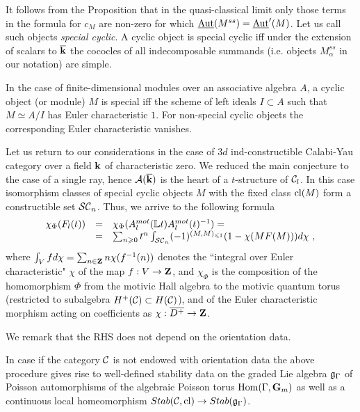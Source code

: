 \documentclass[12pt]{article}
\begin{document}
It follows from the Proposition that in the quasi-classical limit only those terms in the formula for $c_M$ are non-zero for which $\underline{\operatorname{Aut}}(M^{ss})=\underline{\operatorname{Aut}}'(M)$. Let us call such objects {\it special cyclic}.  A cyclic object is special cyclic iff under the extension of scalars
to ${\overline{\bf k}}$ the cococles of all indecomposable summands (i.e. objects $M^{ss}_\alpha$ in our notation) are simple.

In the case of finite-dimensional modules over an associative algebra $A$, a cyclic object (or module) $M$ is special iff the scheme of left ideals $I\subset A$ such that $M\simeq A/I$ has Euler characteristic $1$. For non-special cyclic objects the corresponding Euler characteristic vanishes.

Let us return to our considerations in the case of $3d$ ind-constructible Calabi-Yau category over a field ${\bf k}$ of characteristic zero.  We reduced the main conjecture to the case of a single ray, hence ${\cal A}({\overline{\bf k}})$ is the heart of a $t$-structure of ${\mathcal C}_l$. In this case isomorphism classes of special cyclic objects $M$ with the fixed class $\operatorname{cl}(M)$ form a constructible set ${\cal SC}_n$. Thus, we arrive to the following formula
$$\begin{array}{rcl}\chi_\Phi(F_l(t))&=&\chi_\Phi(A_l^{mot}({\mathbb L}t)A_l^{mot}(t)^{-1})=\\
&=&\sum_{n\geqslant 0}t^n\int_{{\cal SC}_n}(-1)^{(M,M)_{\leqslant 1}}(1-\chi(MF(M)))d\chi\,\,,
\end{array}$$
where 
$\int_V f d\chi=\sum_{n\in{\bf Z}}n \chi(f^{-1}(n))$ denotes the ``integral over Euler characteristic" $\chi$ of the map $f:V\to {\bf Z}$, and $\chi_\Phi$
 is the composition of the homomorphism $\Phi$ from the motivic Hall algebra to the motivic quantum torus (restricted to subalgebra $H^+({\mathcal C})\subset H({\mathcal C})$), and of the Euler characteristic morphism acting on coefficients as $\chi:\overline{D^+}\to {\bf Z}$.

We remark that the RHS does not depend on the orientation data.

\begin{conj} In case if the category ${\mathcal C}$ is not endowed with  orientation data the above procedure gives rise to  well-defined stability data on the graded Lie algebra ${\mathfrak g}_{\Gamma}$ of Poisson automorphisms of the algebraic Poisson torus $\operatorname{Hom}(\Gamma,{\bf G}_m)$ as well as a continuous local homeomorphism $Stab({\mathcal C},\operatorname{cl})\to Stab({\mathfrak g}_{\Gamma})$.


\end{conj}
\end{document}
